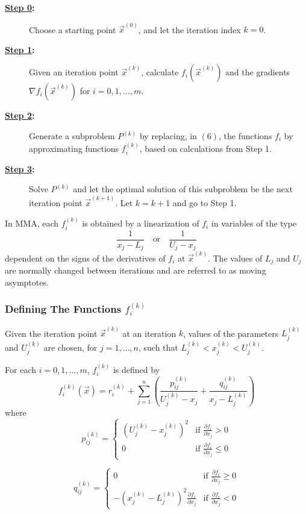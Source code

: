 \begin{description}
	\item[\textbf{\underline{Step 0}:}] Choose a starting point $\vec{x}^{(0)}$, and let the iteration index $k=0$.
	\item[\textbf{\underline{Step 1}:}] Given an iteration point $\vec{x}^{(k)}$, calculate $f_i(\vec{x}^{(k)})$ and the gradients $\nabla f_i(\vec{x}^{(k)})$ for $i=0,1,\ldots,m$.
	\item[\textbf{\underline{Step 2}:}] Generate a subproblem $P^{(k)}$ by replacing, in $(6)$, the functions $f_i$ by approximating functions $f_i^{(k)}$, based on calculations from Step 1.
	\item[\textbf{\underline{Step 3}:}] Solve $P^{(k)}$ and let the optimal solution of this subproblem be the next iteration point $\vec{x}^{(k+1)}$. Let $k=k+1$ and go to Step 1.
\end{description}

In MMA, each $f_i^{(k)}$ is obtained by a linearization of $f_i$ in variables of the type $$\frac{1}{x_j-L_j}\quad\text{or}\quad\frac{1}{U_j-x_j}$$ dependent on the signs of the derivatives of $f_i$ at $\vec{x}^{(k)}$. The values of $L_j$ and $U_j$ are normally changed between iterations and are referred to as moving asymptotes.

\subsubsection*{Defining The Functions $f_i^{(k)}$}

Given the iteration point $\vec{x}^{(k)}$ at an iteration $k$, values of the parameters $L_j^{(k)}$ and $U_j^{(k)}$ are chosen, for $j=1,\ldots,n$, such that $L_j^{(k)}<x_j^{(k)}<U_j^{(k)}$.


For each $i=0,1,\ldots,m$, $f_i^{(k)}$ is defined by $$f_i^{(k)}(\vec{x})=r_i^{(k)}+\sum\limits_{j=1}^{n}\left(\frac{p_{ij}^{(k)}}{U_j^{(k)}-x_j}+\frac{q_{ij}^{(k)}}{x_j-L_j^{(k)}}\right)$$
where
$$p_{ij}^{(k)}=\begin{cases}
\left(U_j^{(k)}-x_j^{(k)}\right)^2 & \text{if }\frac{\partial f_i}{\partial x_j}>0\\
0 & \text{if }\frac{\partial f_i}{\partial x_j}\leq 0
\end{cases}$$
	
$$q_{ij}^{(k)}=\begin{cases}
0 & \text{if }\frac{\partial f_i}{\partial x_j}\geq 0\\
-\left(x_j^{(k)}-L_j^{(k)}\right)^2\frac{\partial f_i}{\partial x_j} & \text{if }\frac{\partial f_i}{\partial x_j}<0
\end{cases}$$
	
